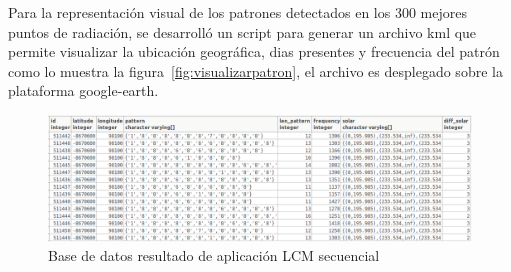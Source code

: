 Para la representación visual de los patrones detectados en los 300 mejores puntos de radiación, se desarrolló un script para generar un archivo kml que permite
visualizar la ubicación geográfica, dias presentes y frecuencia del patrón como lo muestra la figura~\ref{fig:visualizarpatron}, el archivo es desplegado sobre la plataforma google-earth.

\begin{figure}[htbp]
  \centering 
  \includegraphics[scale=0.40]{pictures/bdp.png}
  \caption{Base de datos resultado de aplicación LCM secuencial}
  \label{fig:bdp}
  \centering

\end{figure}
